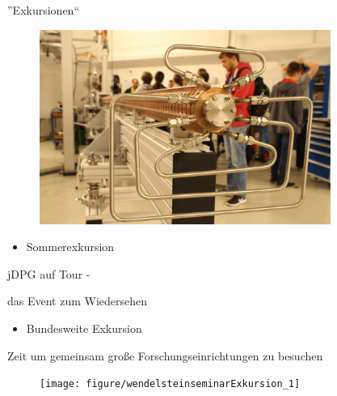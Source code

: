\documentclass[
]{beamer}
\begin{document}
\begin{frame}{''Exkursionen``}
  \begin{minipage}{0.5\textwidth}
    \begin{figure}
      \centering
      \includegraphics[width=0.85\textwidth]{figure/soex_2017}
     \end{figure}
  \end{minipage}%
  \hfill
  \begin{minipage}{0.48\textwidth}
    \begin{itemize}
      \item Sommerexkursion
    \end{itemize}
    \begin{flushleft}
      jDPG auf Tour -
    \end{flushleft}
    \begin{flushright}
      
      \vspace*{-0.4cm}
      das Event zum Wiedersehen
    \end{flushright}
  \end{minipage}

  \vfill

  \begin{minipage}{0.48\textwidth}
    \begin{itemize}
      \item Bundesweite Exkursion
    \end{itemize}
    \begin{center}
      Zeit um gemeinsam große Forschungseinrichtungen zu besuchen
    \end{center}
  \end{minipage}%
  \hfill
  \begin{minipage}{0.5\textwidth}
    \begin{figure}
      \centering
      \texttt{[image: figure/wendelsteinseminarExkursion\_1]}
     \end{figure}
  \end{minipage}
  
\end{frame}
\end{document}
